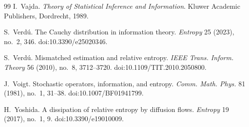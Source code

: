 \begin{thebibliography}{99}
I.~Vajda.
\newblock \emph{Theory of Statistical Inference and Information}.
\newblock Kluwer Academic Publishers, Dordrecht, 1989.

S.~Verd{\'u}.
\newblock The Cauchy distribution in information theory.
\newblock \emph{Entropy} 25 (2023), no.~2, 346.
\newblock doi:10.3390/e25020346.

S.~Verd{\'u}.
\newblock Mismatched estimation and relative entropy.
\newblock \emph{IEEE Trans. Inform. Theory} 56 (2010), no.~8, 3712--3720.
\newblock doi:10.1109/TIT.2010.2050800.

J.~Voigt.
\newblock Stochastic operators, information, and entropy.
\newblock \emph{Comm. Math. Phys.} 81 (1981), no.~1, 31--38.
\newblock doi:10.1007/BF01941799.

H.~Yoshida.
\newblock A dissipation of relative entropy by diffusion flows.
\newblock \emph{Entropy} 19 (2017), no.~1, 9.
\newblock doi:10.3390/e19010009.

\end{thebibliography}
